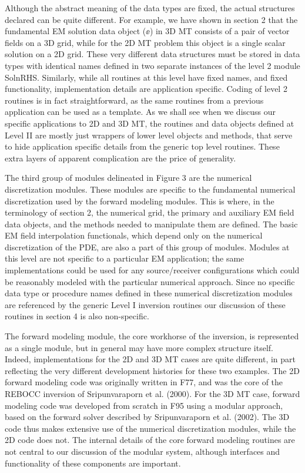 Although the abstract meaning
of the data types are fixed, the actual structures declared can
be quite different.  For example, we have shown in section 2
that the fundamental EM solution data object ($\ee$)
in 3D MT consists of a pair of vector fields on a 3D grid,
while for the 2D MT problem this object is
a single scalar solution on a 2D grid.
These very different data structures must be stored in
data types with identical names
defined in two separate instances of the level 2 module SolnRHS.
Similarly, while all routines at this level
have fixed names, and fixed functionality, implementation details
are application specific.  Coding of level 2 routines is
in fact straightforward, as the same routines from a previous 
application can be used as a template.  As we shall see when
we discuss our specific applications to 2D and 3D MT,
the routines and data objects defined at Level II are mostly
just wrappers of lower level objects and methods, that serve to
hide application specific details from the generic top
level routines.  These extra layers of apparent complication are
the price of generality.

The third group of modules delineated in Figure 3 are the
numerical discretization modules.  These modules are specific
to the fundamental numerical discretization used by the forward
modeling modules.  This is where, in the terminology of section 2,
the numerical grid, the primary and auxiliary 
EM field data objects,
and the methods needed to manipulate them are defined.  The basic EM
field interpolation functionals, which depend only on the
numerical discretization of the PDE, are also a part of this
group of modules.  Modules at this level are not specific to a particular
EM application; the same implementations could be used for
any source/receiver configurations which could be reasonably
modeled with the particular numerical approach.  Since no specific
data type or procedure names defined in these numerical 
discretization modules are referenced by the generic Level I
inversion routines our discussion of these routines in section 4 is also
non-specific.

The forward modeling module, the core workhorse of the inversion,
is represented as a single module, but in general may have more
complex structure itself.
Indeed, implementations for the 2D and 3D MT cases
are quite different, in part reflecting
the very different development histories for these two examples.
The 2D forward modeling code was
originally written in F77, and was the core of the REBOCC inversion
of Sripunvaraporn et al. (2000).   For
the 3D MT case, forward modeling code was
developed from scratch in F95 using a modular approach,
based on the forward solver described by Sripunvaraporn et al. (2002).
The 3D code thus makes extensive use of the numerical discretization
modules, while the 2D code does not.
The internal details of the core forward modeling
routines are not central to our discussion of the modular
system, although interfaces and functionality of these
components are important.

